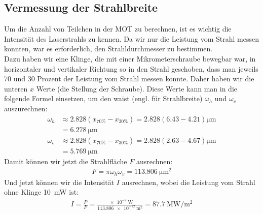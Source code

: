 \documentclass[12pt, a4paper]{article}
\begin{document}
  \subsection{Vermessung der Strahlbreite}
 Um die Anzahl von Teilchen in der MOT zu berechnen, ist es wichtig die Intensität des Laserstrahls zu kennen. Da wir nur die Leistung vom Strahl messen konnten, war es erforderlich, den Strahldurchmesser zu bestimmen.\\
 Dazu haben wir eine Klinge, die mit einer Mikrometerschraube bewegbar war, in horizontaler und vertikaler Richtung so in den Strahl geschoben, dass man jeweils 70 und 30 Prozent der Leistung vom Strahl messen konnte. Daher haben wir die unteren $x$ Werte (die Stellung der Schraube). Diese Werte kann man in die folgende Formel einsetzen, um den waist (engl. für Strahlbreite) $\omega_h$ und $\omega_v$ auszurechnen:
  \begin{align*}
  \omega_h & \approx 2.828(x_{70\%}-x_{30\%})
  =2.828(6.43-4.21) \si{\micro\m}\\
  &=\SI{6.278}{\micro\m}\\
  \omega_v &\approx 2.828(x_{70\%}-x_{30\%})=2.828(2.63-4.67) \si{\micro\m}\\&=\SI{5.769}{\micro\m}
   \end{align*}
   Damit können wir jetzt die Strahlfläche $F$ ausrechnen:
   \begin{align*}
   F=\pi \omega_h \omega_v =\SI{113.806}{\micro\m^2}
   \end{align*}
   Und jetzt können wir die Intensität $I$ ausrechnen, wobei die Leistung vom Strahl ohne Klinge \SI{10} {\mW} ist:
   \begin{align*}
   I=\frac{P}{F}=\frac{\SI{e-2}{\W}}{\SI{113.806e-12}{\m^2}}=\SI{87.7}{\mega\W\per\square\m}
   \end{align*}
\end{document}
